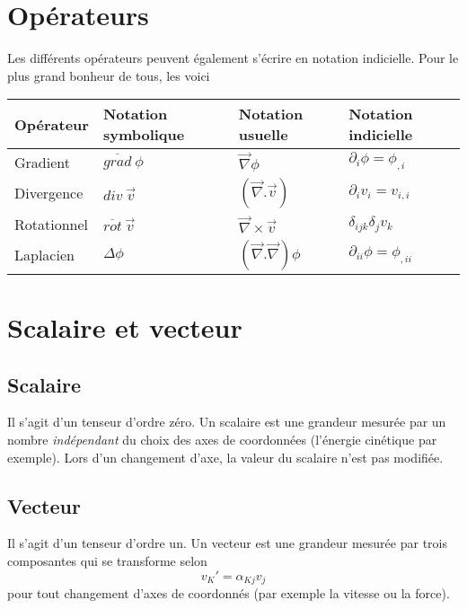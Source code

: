         
        
        
        
        
\section{Opérateurs}
Les différents opérateurs peuvent également s'écrire en notation indicielle. Pour le plus grand 
bonheur de tous, les voici
    
\begin{center}
	\begin{tabularx}{10cm}{|X|X|X|X|}
		\hline 
		Opérateur  & Notation symbolique       & Notation usuelle                  & Notation indicielle \tabularnewline          
		\hline 
		Gradient    & $\overline{grad}\ \phi$   & $\vec{\nabla}\phi$                & $\partial_i \phi = \phi_{,i}$\tabularnewline 
		\hline 
		Divergence  & $div\ \vec{v}$            & $(\vec{\nabla}.\vec{v})$          & $\partial_i v_i = v_{i,i}$\tabularnewline    
		\hline
		Rotationnel & $\overline{rot}\ \vec{v}$ & $\vec{\nabla}\times \vec{v}$      & $\delta_{ijk}\delta_j v_k$\tabularnewline    
		\hline
		Laplacien   & $\Delta \phi$             & $(\vec{\nabla}.\vec{\nabla})\phi$ & $\partial_{ii} \phi                          
		= \phi_{,ii}$\tabularnewline
		\hline
	\end{tabularx}
	\label{tab:comparaison}
\end{center}
    
\section{Scalaire et vecteur}

\subsection{Scalaire}
Il s'agit d'un tenseur d'ordre zéro. Un scalaire est une grandeur mesurée par un nombre 
\textit{indépendant} du choix des axes de coordonnées (l'énergie cinétique par exemple). Lors d'un
changement d'axe, la valeur du scalaire n'est pas modifiée.

\subsection{Vecteur}
Il s'agit d'un tenseur d'ordre un. Un vecteur est une grandeur mesurée par trois composantes qui
se transforme selon
\begin{equation}
	v_K' = \alpha_{Kj}v_j
\end{equation}
pour tout changement d'axes de coordonnés (par exemple la vitesse ou la force).

